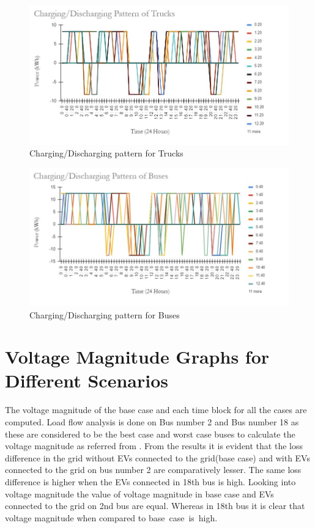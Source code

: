 		\begin{figure}[!h]
		\centering
		\includegraphics[width=0.7\linewidth]{Figures/cp_case2}
		\caption{Charging/Discharging pattern for Trucks}
		\label{fig:cpcase2}
		\end{figure}
	
		\begin{figure}[!h]
			\centering
			\includegraphics[width=0.7\linewidth]{Figures/cp_case3}
			\caption{Charging/Discharging pattern for Buses}
			\label{fig:cpcase3}
		\end{figure}


			
			
			
			
			
			
			
	\section{Voltage Magnitude Graphs for Different Scenarios}
	
	The voltage magnitude of the base case and each time block for  all the cases are computed. Load flow analysis is done on Bus number 2 and Bus number 18 as these are considered to be the best case and worst case buses to calculate the voltage magnitude as referred from \cite{33bus}. From the results it is evident that the loss difference in the grid without EVs connected to the grid(base case) and with EVs connected to the grid on bus number 2 are comparatively lesser. The same loss difference is higher when the EVs connected in 18th bus is high. Looking into voltage magnitude the value of voltage magnitude in base case and EVs connected to the grid on 2nd bus are equal. Whereas in 18th bus it is clear that voltage magnitude when compared to base case is high.
	
